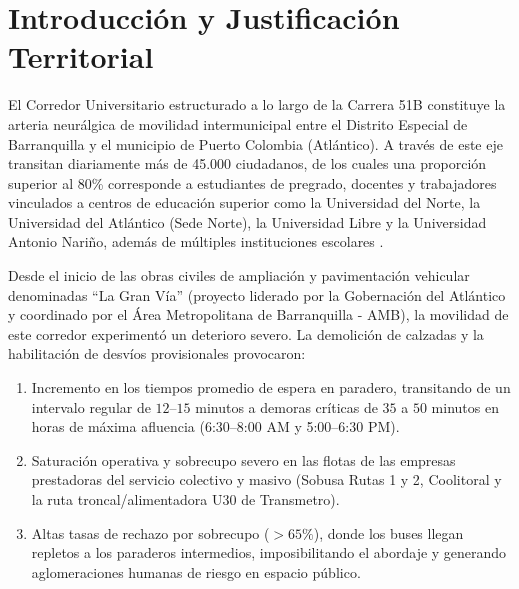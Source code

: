 \documentclass[11pt,letterpaper]{article}
\begin{document}
\section{Introducción y Justificación Territorial}

El Corredor Universitario estructurado a lo largo de la Carrera 51B constituye la arteria neurálgica de movilidad intermunicipal entre el Distrito Especial de Barranquilla y el municipio de Puerto Colombia (Atlántico). A través de este eje transitan diariamente más de 45.000 ciudadanos, de los cuales una proporción superior al 80\% corresponde a estudiantes de pregrado, docentes y trabajadores vinculados a centros de educación superior como la Universidad del Norte, la Universidad del Atlántico (Sede Norte), la Universidad Libre y la Universidad Antonio Nariño, además de múltiples instituciones escolares \cite{amb2023}.

Desde el inicio de las obras civiles de ampliación y pavimentación vehicular denominadas ``La Gran Vía'' (proyecto liderado por la Gobernación del Atlántico y coordinado por el Área Metropolitana de Barranquilla - AMB), la movilidad de este corredor experimentó un deterioro severo. La demolición de calzadas y la habilitación de desvíos provisionales provocaron:
\begin{enumerate}
    \item Incremento en los tiempos promedio de espera en paradero, transitando de un intervalo regular de $12$--$15$ minutos a demoras críticas de $35$ a $50$ minutos en horas de máxima afluencia (6:30--8:00 AM y 5:00--6:30 PM).
    \item Saturación operativa y sobrecupo severo en las flotas de las empresas prestadoras del servicio colectivo y masivo (Sobusa Rutas 1 y 2, Coolitoral y la ruta troncal/alimentadora U30 de Transmetro).
    \item Altas tasas de rechazo por sobrecupo ($>65\%$), donde los buses llegan repletos a los paraderos intermedios, imposibilitando el abordaje y generando aglomeraciones humanas de riesgo en espacio público.
\end{enumerate}
\end{document}

